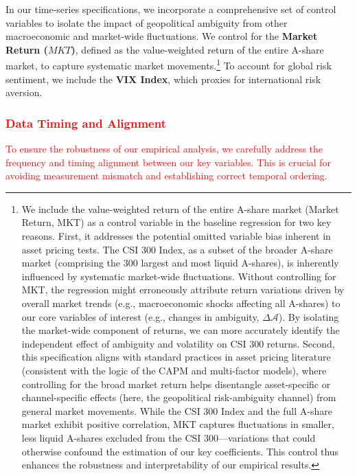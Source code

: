 \documentclass[preprint,12pt,authoryear]{elsarticle}
\begin{document}
In our time-series specifications, we incorporate a comprehensive set of control variables to isolate the impact of geopolitical ambiguity from other macroeconomic and market-wide fluctuations. We control for the \textbf{Market Return ($MKT$)}, defined as the value-weighted return of the entire A-share market, to capture systematic market movements.\footnote{We include the value-weighted return of the entire A-share market (Market Return, MKT) as a control variable in the baseline regression for two key reasons. First, it addresses the potential omitted variable bias inherent in asset pricing tests. The CSI 300 Index, as a subset of the broader A-share market (comprising the 300 largest and most liquid A-shares), is inherently influenced by systematic market-wide fluctuations. Without controlling for MKT, the regression might erroneously attribute return variations driven by overall market trends (e.g., macroeconomic shocks affecting all A-shares) to our core variables of interest (e.g., changes in ambiguity, $\Delta\mathcal{A}$). By isolating the market-wide component of returns, we can more accurately identify the independent effect of ambiguity and volatility on CSI 300 returns. Second, this specification aligns with standard practices in asset pricing literature (consistent with the logic of the CAPM and multi-factor models), where controlling for the broad market return helps disentangle asset-specific or channel-specific effects (here, the geopolitical risk-ambiguity channel) from general market movements. While the CSI 300 Index and the full A-share market exhibit positive correlation, MKT captures fluctuations in smaller, less liquid A-shares excluded from the CSI 300—variations that could otherwise confound the estimation of our key coefficients. This control thus enhances the robustness and interpretability of our empirical results.} To account for global risk sentiment, we include the \textbf{VIX Index}, which proxies for international risk aversion.

\subsubsection{\textcolor{red}{Data Timing and Alignment}}
\textcolor{red}{To ensure the robustness of our empirical analysis, we carefully address the frequency and timing alignment between our key variables. This is crucial for avoiding measurement mismatch and establishing correct temporal ordering.}
\end{document}
